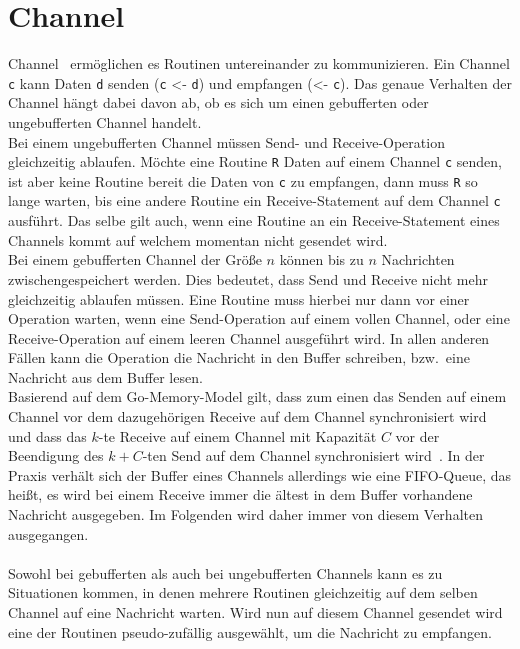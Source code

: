 \section{Channel}\label{Chap:Back-Sec:Chann}
Channel~\cite{effectiveGo} ermöglichen es Routinen untereinander zu 
kommunizieren.
Ein Channel \texttt{c} kann Daten \texttt{d} senden (\texttt{c} <- \texttt{d})
und empfangen (<- \texttt{c}). Das genaue Verhalten der Channel hängt dabei 
davon ab, ob es sich um einen gebufferten oder ungebufferten Channel handelt. \\
Bei einem ungebufferten Channel müssen Send- und Receive-Operation gleichzeitig 
ablaufen. Möchte eine Routine \texttt{R} Daten auf einem Channel \texttt{c} senden, 
ist aber keine Routine bereit die Daten von \texttt{c} zu empfangen, 
dann muss \texttt{R} so lange warten, bis eine andere Routine ein
Receive-Statement auf dem Channel \texttt{c} ausführt. Das selbe gilt auch, wenn 
eine Routine an ein Receive-Statement eines Channels kommt auf welchem 
momentan nicht gesendet wird.\\
Bei einem gebufferten Channel der Größe $n$ können bis zu $n$ Nachrichten
zwischengespeichert werden. Dies bedeutet, dass Send und Receive nicht mehr 
gleichzeitig ablaufen müssen. Eine Routine muss hierbei nur dann 
vor einer Operation warten, wenn eine Send-Operation auf einem vollen 
Channel, oder eine Receive-Operation auf einem leeren Channel ausgeführt 
wird. In allen anderen Fällen kann die Operation die Nachricht in den Buffer 
schreiben, bzw.~eine Nachricht aus dem Buffer lesen.\\
Basierend auf dem 
Go-Memory-Model gilt, dass zum einen das Senden auf einem Channel vor dem 
dazugehörigen Receive auf dem Channel synchronisiert wird und dass 
das $k$-te Receive auf einem Channel mit Kapazität $C$ vor der Beendigung
des $k+C$-ten Send auf dem Channel synchronisiert wird~\cite{memModel}.   
In der Praxis verhält sich der Buffer eines Channels allerdings wie eine FIFO-Queue,
das heißt, es wird bei einem Receive immer die ältest in dem
Buffer vorhandene Nachricht ausgegeben. Im Folgenden wird daher immer von diesem 
Verhalten ausgegangen.\\\\
Sowohl bei gebufferten als auch bei ungebufferten Channels kann es zu 
Situationen kommen, in denen mehrere Routinen gleichzeitig auf dem selben 
Channel auf eine Nachricht warten. Wird nun auf diesem Channel gesendet 
wird eine der Routinen pseudo-zufällig ausgewählt, um die Nachricht zu empfangen.\\\\
